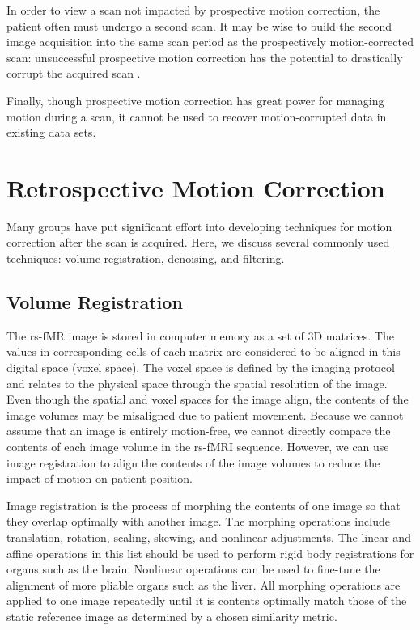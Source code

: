 In order to view a scan not impacted by prospective motion correction, the patient often must undergo a second scan. It may be wise to build the second image acquisition into the same scan period as the prospectively motion-corrected scan: unsuccessful prospective motion correction has the potential to drastically corrupt the acquired scan \cite{Zaitsev2017}.

Finally, though prospective motion correction has great power for managing motion during a scan, it cannot be used to recover motion-corrupted data in existing data sets.


\section{Retrospective Motion Correction}

Many groups have put significant effort into developing techniques for motion correction after the scan is acquired. Here, we discuss several commonly used techniques: volume registration, denoising, and filtering.

\subsection{Volume Registration}

The rs-fMR image is stored in computer memory as a set of 3D matrices. The values in corresponding cells of each matrix are considered to be aligned in this digital space (voxel space). The voxel space is defined by the imaging protocol and relates to the physical space through the spatial resolution of the image. Even though the spatial and voxel spaces for the image align, the contents of the image volumes may be misaligned due to patient movement. Because we cannot assume that an image is entirely motion-free, we cannot directly compare the contents of each image volume in the rs-fMRI sequence. However, we can use image registration to align the contents of the image volumes to reduce the impact of motion on patient position.

Image registration is the process of morphing the contents of one image so that they overlap optimally with another image. The morphing operations include translation, rotation, scaling, skewing, and nonlinear adjustments. The linear and affine operations in this list should be used to perform rigid body registrations for organs such as the brain. Nonlinear operations can be used to fine-tune the alignment of more pliable organs such as the liver. All morphing operations are applied to one image repeatedly until it is contents optimally match those of the static reference image as determined by a chosen similarity metric. 

